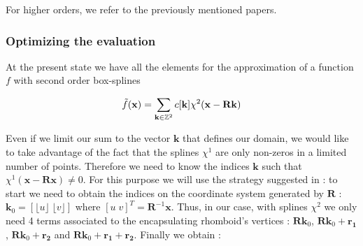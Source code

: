 \documentclass[proc]{edpsmath}
\begin{document}
%

For higher orders, we refer to the previously mentioned papers.

\subsubsection{Optimizing the evaluation}

At the present state we have all the elements for the approximation of a function $f$ with second order box-splines

\begin{equation}
\tilde{f}(\mathbf{x}) = \sum_{\mathbf{k} \in \mathbb{Z}^2} c[\mathbf{k}] \chi^2(\mathbf{x} - \mathbf{R}\mathbf{k})
\end{equation}

Even if we limit our sum to the vector $\mathbf{k}$ that defines our domain, we would like to take advantage of the fact that the splines $\chi^1$ are only non-zeros in a limited number of points. Therefore we need to know the indices $\mathbf{k}$ such that $\chi^1(\mathbf{x} - \mathbf{R} \mathbf{x}) \neq 0$. For this purpose we will use the strategy suggested in \cite{Condat2007} : to start we need to obtain the indices on the coordinate system generated by $\mathbf{R}$ : $\mathbf{k}_0 = \left[ \lfloor u \rfloor \; \lfloor v \rfloor \right]$ where $\left[ u \; v \right]^T = \mathbf{R}^ {-1} \mathbf{x} $. Thus, in our case, with splines $\chi^2$ we only need 4 terms associated to the encapsulating rhomboid's vertices : $\mathbf{R}\mathbf{k}_0$, $\mathbf{R}\mathbf{k}_0 + \mathbf{r_1}$, $\mathbf{R}\mathbf{k}_0 + \mathbf{r_2}$ and $\mathbf{R}\mathbf{k}_0 + \mathbf{r_1} + \mathbf{r_2}$. Finally we obtain :
\end{document}
